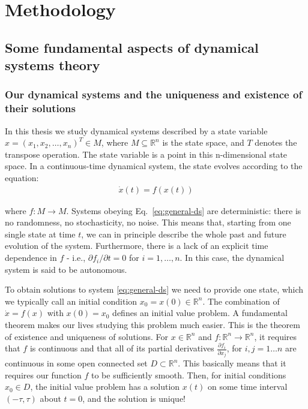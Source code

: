 \chapter{Methodology}

\section{Some fundamental aspects of dynamical systems theory}

\subsection{Our dynamical systems and the uniqueness and existence of their solutions}
In this thesis we study dynamical systems described by a state variable $x = (x_1, x_2, \ldots, x_n)^T \in M $, where $M \subseteq \mathbb{R}^n$ is the state space, and $T$ denotes the transpose operation. The state variable is a point in this n-dimensional state space. In a continuous-time dynamical system, the state evolves according to the equation:
%
\begin{align}
    \dot{x}(t) = f(x(t))
    \label{eq:general-ds}
\end{align}

where $f:M\to M$. Systems obeying Eq.~\ref{eq:general-ds} are deterministic: there is no randomness, no stochasticity, no noise. This means that, starting from one single state at time $t$, we can in principle describe the whole past and future evolution of the system. Furthermore, there is a lack of an explicit time dependence in $f$ - i.e., ${\partial f_i}/{\partial t} = 0$ for $i=1, \ldots, n$. In this case, the dynamical system is said to be autonomous. 

To obtain solutions to system \ref{eq:general-ds} we need to provide one state, which we typically call an initial condition $x_0 = x(0) \in \mathbb{R}^n$. The combination of $\dot{x} = f(x)$ with $x(0) = x_0$ defines an initial value problem. A fundamental theorem makes our lives studying this problem much easier. This is the theorem of existence and uniqueness of solutions. For $x \in \mathbb{R}^n$ and $f:\mathbb{R}^n\to\mathbb{R}^n$, it requires that $f$ is continuous and that all of its partial derivatives $\frac{\partial f_i}{\partial x_j}$, for $i, j = 1\ldots n$ are continuous in some open connected set $D \subset \mathbb{R}^n$. This basically means that it requires our function $f$ to be sufficiently smooth. Then, for initial conditions $x_0 \in D$, the initial value problem has a solution $x(t)$ on some time interval $(-\tau, \tau)$ about $t=0$, and the solution is unique! \cite{strogatz2002nonlinear} 

